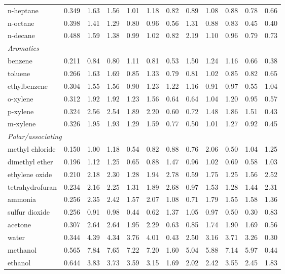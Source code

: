 \begin{table}[H]
\begin{tabular}{lccccccccccc}
n-heptane & 0.349 & 1.63 & 1.56 & 1.01 & 1.18 & 0.82 & 0.89 & 1.08 & 0.88 & 0.78 & 0.66 \\
n-octane & 0.398 & 1.41 & 1.29 & 0.80 & 0.96 & 0.56 & 1.31 & 0.88 & 0.83 & 0.45 & 0.40 \\
n-decane & 0.488 & 1.59 & 1.38 & 0.99 & 1.02 & 0.82 & 2.19 & 1.10 & 0.96 & 0.79 & 0.73 \\
\multicolumn{15}{l}{\emph{Aromatics}} \\
benzene & 0.211 & 0.84 & 0.80 & 1.11 & 0.81 & 0.53 & 1.50 & 1.24 & 1.16 & 0.66 & 0.38 \\
toluene & 0.266 & 1.63 & 1.69 & 0.85 & 1.33 & 0.79 & 0.81 & 1.02 & 0.85 & 0.82 & 0.65 \\
ethylbenzene & 0.304 & 1.55 & 1.56 & 0.90 & 1.23 & 1.22 & 1.16 & 0.91 & 0.97 & 0.55 & 1.04 \\
o-xylene & 0.312 & 1.92 & 1.92 & 1.23 & 1.56 & 0.64 & 0.64 & 1.04 & 1.20 & 0.95 & 0.57 \\
p-xylene & 0.324 & 2.56 & 2.54 & 1.89 & 2.20 & 0.60 & 0.72 & 1.48 & 1.86 & 1.51 & 0.43 \\
m-xylene & 0.326 & 1.95 & 1.93 & 1.29 & 1.59 & 0.77 & 0.50 & 1.01 & 1.27 & 0.92 & 0.45 \\
\multicolumn{15}{l}{\emph{Polar/associating}} \\
methyl chloride & 0.150 & 1.00 & 1.18 & 0.54 & 0.82 & 0.88 & 0.76 & 2.06 & 0.50 & 1.04 & 1.25 \\
dimethyl ether & 0.196 & 1.12 & 1.25 & 0.65 & 0.88 & 1.47 & 0.96 & 1.02 & 0.69 & 0.58 & 1.03 \\
ethylene oxide & 0.210 & 2.18 & 2.30 & 1.28 & 1.94 & 2.78 & 0.59 & 1.75 & 1.25 & 1.56 & 2.52 \\
tetrahydrofuran & 0.234 & 2.16 & 2.25 & 1.31 & 1.89 & 2.68 & 0.97 & 1.53 & 1.28 & 1.44 & 2.31 \\
ammonia & 0.256 & 2.35 & 2.42 & 1.57 & 2.07 & 1.08 & 0.71 & 1.79 & 1.55 & 1.58 & 1.36 \\
sulfur dioxide & 0.256 & 0.91 & 0.98 & 0.44 & 0.62 & 1.37 & 1.05 & 0.97 & 0.50 & 0.30 & 0.83 \\
acetone & 0.307 & 2.64 & 2.64 & 1.95 & 2.29 & 0.63 & 0.85 & 1.74 & 1.90 & 1.69 & 0.56 \\
water & 0.344 & 4.39 & 4.34 & 3.76 & 4.01 & 0.43 & 2.50 & 3.16 & 3.71 & 3.26 & 0.30 \\
methanol & 0.565 & 7.84 & 7.65 & 7.22 & 7.20 & 1.60 & 5.04 & 5.88 & 7.14 & 5.97 & 0.44 \\
ethanol & 0.644 & 3.83 & 3.73 & 3.59 & 3.15 & 1.69 & 2.02 & 2.42 & 3.55 & 2.45 & 1.83 \\

\end{tabular}
\end{table}
